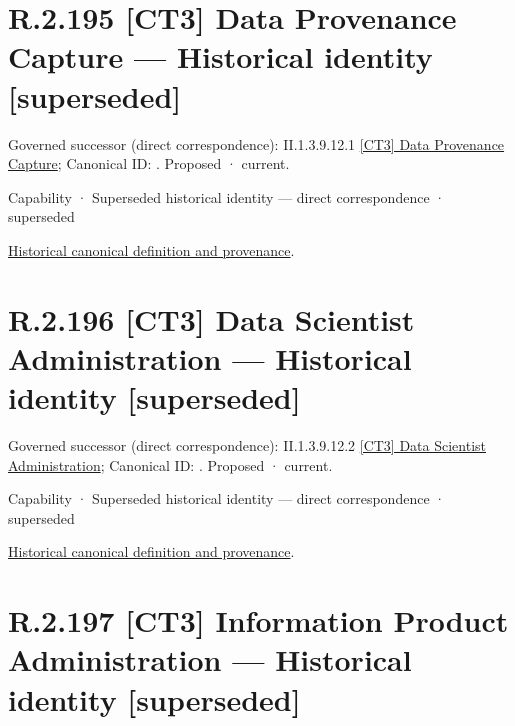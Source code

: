 \section*{R.2.195 [CT3] Data Provenance Capture — Historical identity [superseded]}
\label{navigation:R.2.195}

{\small Governed successor (direct correspondence): II.1.3.9.12.1 \hyperref[element:44a7937520a54945b06b5fd4a2bbd870]{[CT3] Data Provenance Capture}; Canonical ID: \texttt{}. Proposed · current.}\par
\label{element:61258c7fe41f4541871a67ec9d7185cf}
{\small Capability · Superseded historical identity — direct correspondence · superseded}\par
\href{../../../../continuum/strategy/capability/61258c7fe41f4541871a67ec9d7185cf.md}{Historical canonical definition and provenance}.\par
\section*{R.2.196 [CT3] Data Scientist Administration — Historical identity [superseded]}
\label{navigation:R.2.196}

{\small Governed successor (direct correspondence): II.1.3.9.12.2 \hyperref[element:3bb1a11fba234717bf40c9e6452f401a]{[CT3] Data Scientist Administration}; Canonical ID: \texttt{}. Proposed · current.}\par
\label{element:1cb497aec93c4b82ba7f5b622813e54e}
{\small Capability · Superseded historical identity — direct correspondence · superseded}\par
\href{../../../../continuum/strategy/capability/1cb497aec93c4b82ba7f5b622813e54e.md}{Historical canonical definition and provenance}.\par
\section*{R.2.197 [CT3] Information Product Administration — Historical identity [superseded]}
\label{navigation:R.2.197}

